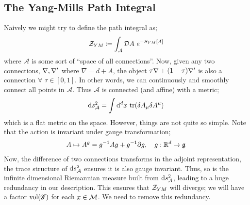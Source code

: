 \subsection{The Yang-Mills Path Integral}
Naively we might try to define the path integral as;
\begin{equation*}
\mathcal{Z}_{YM} \coloneqq \int_{\mathcal{A}}{\mathcal{D} A\,\,e^{-S_{YM}[A]}}
\end{equation*}
where $\mathcal{A}$ is some sort of  ``space of all connections''. Now, given any two connections, $\nabla, \nabla^{\prime}$ where $\nabla = d + A$, the object $\tau \nabla + (1- \tau)\nabla^{\prime}$ is also a connection $\forall \,\, \tau \in [0,1]$. In other words, we can continuously and smoothly connect all points in $\mathcal{A}$. Thus $\mathcal{A}$ is connected (and affine) with a metric;
\begin{equation}
\text{d} s^2_{\mathcal{A}} = \int{\text{d}^d x \,\tr(\delta A_\mu \delta A^\mu)}
\end{equation}
which is a flat metric on the space. However, things are not quite so simple. Note that the action is invariant under gauge transformation;
\begin{equation*}
A \mapsto A^g = g^{-1}Ag + g^{-1}\partial g, \quad g : \mathbb{R}^d \rightarrow \mathfrak{g}
\end{equation*}
Now, the difference of two connections transforms in the adjoint representation, the trace structure of $\text{d} s^2_{\mathcal{A}}$ ensures it is also gauge invariant. Thus, so is the infinite dimensional Riemannian measure built from $\text{d} s^2_{\mathcal{A}}$, leading to a huge redundancy in our description. This ensures that $\mathcal{Z}_{YM}$ will diverge; we will have a factor $\text{vol}(\mathscr{G})$ for each $x \in \mathcal{M}$. We need to remove this redundancy.
